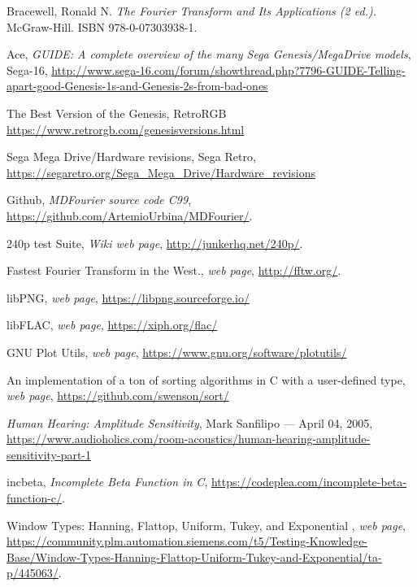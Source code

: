 \documentclass[10pt,a4paper]{report}
\begin{document}
\begin{thebibliography}{9}
	Bracewell, Ronald N. 
	\textit{The Fourier Transform and Its Applications (2 ed.).}
	McGraw-Hill. ISBN 978-0-07303938-1.
	
	Ace, \textit{GUIDE: A complete overview of the many Sega Genesis/MegaDrive models}, Sega-16,
	\url{http://www.sega-16.com/forum/showthread.php?7796-GUIDE-Telling-apart-good-Genesis-1s-and-Genesis-2s-from-bad-ones}
	
	The Best Version of the Genesis, RetroRGB
	\url{https://www.retrorgb.com/genesisversions.html}
	
	Sega Mega Drive/Hardware revisions, Sega Retro,
	\url{https://segaretro.org/Sega_Mega_Drive/Hardware_revisions}
	
	Github,
	\textit{MDFourier source code C99},
	\url{https://github.com/ArtemioUrbina/MDFourier/}.
	
	240p test Suite,
	\textit{Wiki web page},
	\url{http://junkerhq.net/240p/}.
	
	Fastest Fourier Transform in the West.,
	\textit{web page},
	\url{http://fftw.org/}.
	
	libPNG,
	\textit{web page},
	\url{https://libpng.sourceforge.io/}
	
	libFLAC,
	\textit{web page},
	\url{https://xiph.org/flac/}
	
	GNU Plot Utils,
	\textit{web page},
	\url{https://www.gnu.org/software/plotutils/}
	
	An implementation of a ton of sorting algorithms in C with a user-defined type,
	\textit{web page},
	\url{https://github.com/swenson/sort/}
	
	\textit{Human Hearing: Amplitude Sensitivity}, 
	Mark Sanfilipo — April 04, 2005,
	\url{https://www.audioholics.com/room-acoustics/human-hearing-amplitude-sensitivity-part-1}
	
	incbeta, 
	\textit{Incomplete Beta Function in C},
	\url{https://codeplea.com/incomplete-beta-function-c/}.
	
	Window Types: Hanning, Flattop, Uniform, Tukey, and Exponential ,
	\textit{web page},
	\url{https://community.plm.automation.siemens.com/t5/Testing-Knowledge-Base/Window-Types-Hanning-Flattop-Uniform-Tukey-and-Exponential/ta-p/445063/}.
	

\end{thebibliography}
\end{document}
